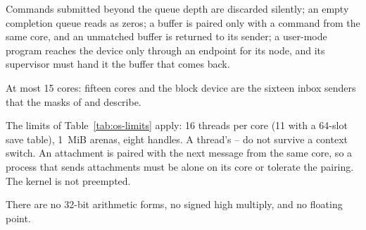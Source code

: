 \begin{description}[leftmargin=1em,style=nextline]
\item[Block device] Commands submitted beyond the queue depth are discarded silently; an empty
  completion queue reads as zeros; a buffer is paired only with a command from the same core, and
  an unmatched buffer is returned to its sender; a user-mode program reaches the device only through an endpoint for its
  node, and its supervisor must hand it the buffer that comes back.
\item[Cores] At most 15 cores: fifteen cores and the block device are the sixteen inbox senders that
  the masks of  and  describe.
\item[StrataOS] The limits of Table~\ref{tab:os-limits} apply: 16 threads per core (11 with a 64-slot save table), 1~MiB arenas,
  eight handles. A thread's -- do not survive a context switch. An attachment is paired
  with the next message from the same core, so a process that sends attachments must be alone on its
  core or tolerate the pairing. The kernel is not preempted.
\item[Integer arithmetic] There are no 32-bit arithmetic forms, no signed high multiply, and no
  floating point.
\end{description}
